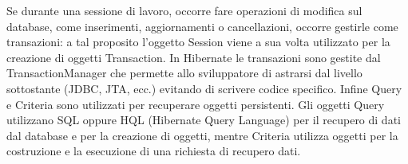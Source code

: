 Se durante una sessione di lavoro, occorre fare operazioni di modifica sul database, come inserimenti, aggiornamenti o cancellazioni, occorre gestirle come transazioni: a tal proposito l'oggetto Session viene a sua volta utilizzato per la creazione di oggetti Transaction. 
In Hibernate le transazioni sono gestite dal TransactionManager che permette allo sviluppatore di astrarsi dal livello sottostante (JDBC, JTA, ecc.) evitando di scrivere codice specifico. Infine Query e Criteria sono utilizzati per recuperare oggetti persistenti. Gli oggetti Query utilizzano SQL oppure HQL (Hibernate Query Language) per il recupero di dati dal database e per la creazione di oggetti, mentre Criteria utilizza oggetti per la costruzione e la esecuzione di una richiesta di recupero dati. 
